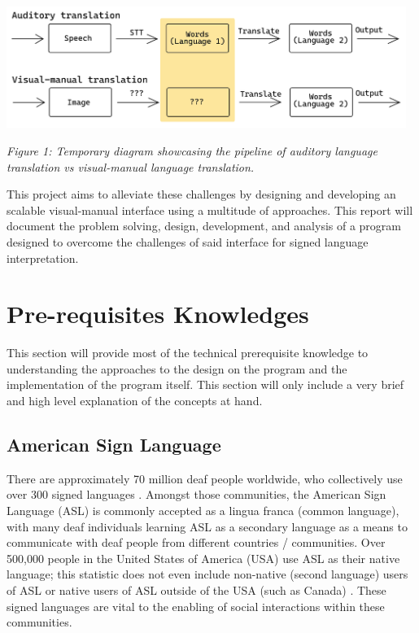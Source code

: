 \documentclass[11pt]{article}
\begin{document}
    \begin{center}
        \includegraphics[width=13cm]{audVsVM.png}
        \\
        \raggedright \textit{
        Figure 1: Temporary diagram showcasing the pipeline of auditory language translation vs visual-manual language translation.
        }
    \end{center}

    This project aims to alleviate these challenges by designing and developing an scalable visual-manual interface using a multitude of approaches. This report will document the problem solving, design, development, and analysis of a program designed to overcome the challenges of said interface for signed language interpretation.


\section{Pre-requisites Knowledges}
    This section will provide most of the technical prerequisite knowledge to understanding the approaches to the design on the program and the implementation of the program itself. This section will only include a very brief and high level explanation of the concepts at hand.

    \subsection{American Sign Language}
        There are approximately 70 million deaf people worldwide, who collectively use over 300 signed languages \cite{lingsoc}. Amongst those communities, the American Sign Language (ASL) is commonly accepted as a lingua franca (common language), with many deaf individuals learning ASL as a secondary language as a means to communicate with deaf people from different countries / communities. Over 500,000 people in the United States of America (USA) use ASL as their native language; this statistic does not even include non-native (second language) users of ASL or native users of ASL outside of the USA (such as Canada) \cite{ASL}. These signed languages are vital to the enabling of social interactions within these communities. 
\end{document}
